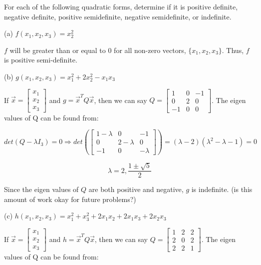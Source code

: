 \documentclass[12pt]{extarticle}
\theoremstyle{definition}
\begin{document}
\begin{problem}
	For each of the following quadratic forms, determine if it is positive definite, negative definite, positive semidefinite, negative semidefinite, or indefinite.

	\begin{description}
		\item{(a)} $f(x_1,x_2,x_3)=x_2^2$

			$f$ will be greater than or equal to $0$ for all non-zero vectors, $\{x_1,x_2,x_3\}$. Thus, $f$ is positive semi-definite.

		\item{(b)} $g(x_1,x_2,x_3)=x_1^2+2x_2^2-x_1x_3$

			If $\vec{x} = \begin{bmatrix}x_1\\x_2\\x_3\end{bmatrix}$ and $g = \vec{x}^TQ\vec{x}$, then we can 
			say $Q = \begin{bmatrix}1 & 0 & -1\\ 0 & 2 & 0 \\ -1 & 0 & 0\end{bmatrix}$. The eigen values of Q can be found from:

			$$det(Q - \lambda I_3) = 0 \Longrightarrow det(\begin{bmatrix}1-\lambda & 0 & -1\\ 0 & 2-\lambda & 0 \\ -1 & 0 & -\lambda\end{bmatrix}) 
			= (\lambda-2)({\lambda}^2-\lambda-1) = 0$$

			$$\lambda = 2, \frac{1 \pm \sqrt{5}}{2}$$

			Since the eigen values of $Q$ are both positive and negative, $g$ is indefinite. (is this amount of work okay for future problems?)

		\item{(c)} $h(x_1,x_2,x_3)=x_1^2+x_3^2+2x_1x_2+2x_1x_3+2x_2x_3$

			If $\vec{x} = \begin{bmatrix}x_1\\x_2\\x_3\end{bmatrix}$ and $h = \vec{x}^TQ\vec{x}$, then we can 
			say $Q = \begin{bmatrix}1 & 2 & 2\\ 2 & 0 & 2 \\ 2 & 2 & 1\end{bmatrix}$. The eigen values of Q can be found from:


\end{description}
\end{problem}
\end{document}
